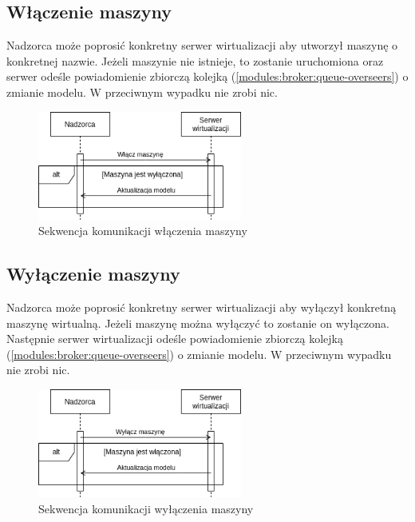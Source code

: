 \documentclass[../opis-rozwiazania.tex]{subfiles}
\begin{document}
\subsection{Włączenie maszyny}

Nadzorca może poprosić konkretny serwer wirtualizacji aby utworzył maszynę o konkretnej nazwie.
Jeżeli maszynie nie istnieje, to zostanie uruchomiona oraz serwer odeśle powiadomienie zbiorczą kolejką (\ref{modules:broker:queue-overseers}) o zmianie modelu.
W przeciwnym wypadku nie zrobi nic.

\begin{figure}[H]
  \centering
  \includegraphics[width=0.6\textwidth]{../diagrams/sequence_diagrams/wlaczenie_maszyny.png}
  \caption{Sekwencja komunikacji włączenia maszyny}
  \label{figure:diagrams:sequence_diagrams:wlaczenie_maszyny}
\end{figure}

\subsection{Wyłączenie maszyny}

Nadzorca może poprosić konkretny serwer wirtualizacji aby wyłączył konkretną maszynę wirtualną.
Jeżeli maszynę można wyłączyć to zostanie on wyłączona.
Następnie serwer wirtualizacji odeśle powiadomienie zbiorczą kolejką (\ref{modules:broker:queue-overseers}) o zmianie modelu.
W przeciwnym wypadku nie zrobi nic.

\begin{figure}[H]
  \centering
  \includegraphics[width=0.6\textwidth]{../diagrams/sequence_diagrams/wylaczenie_maszyny.png}
  \caption{Sekwencja komunikacji wyłączenia maszyny}
  \label{figure:diagrams:sequence_diagrams:wylaczenie_maszyny}
\end{figure}
\end{document}
